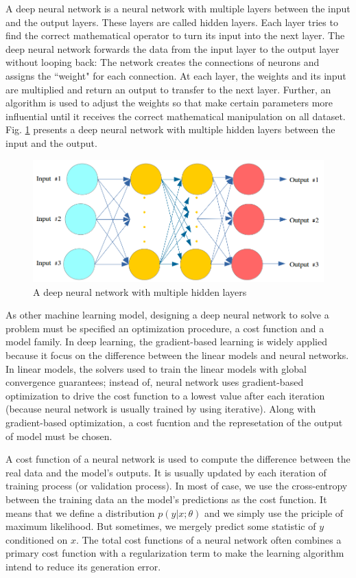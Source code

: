A deep neural network is a neural network with multiple layers between the input and the output layers. These layers are called hidden layers. Each layer tries to find the correct mathematical operator to turn its input into the next layer. The deep neural network forwards the data from the input layer to the output layer without looping back: The network creates the connections of neurons and assigns the ``weight" for each connection. At each layer, the weights and its input are multiplied and return an output to transfer to the next layer. Further, an algorithm is used to adjust the weights so that make certain parameters more influential until it receives the correct mathematical manipulation on all dataset. Fig. \ref{figndeepnetworks} presents a deep neural network with multiple hidden layers between the input and the output.

\begin{figure}[h]
	\centering
	\includegraphics[scale=0.5]{images/deep_neural_network}
	\caption{A deep neural network with multiple hidden layers}
	\label{figndeepnetworks}
\end{figure}

As other machine learning model, designing a deep neural network to solve a problem must be specified an optimization procedure, a cost function and a model family. In deep learning, the gradient-based learning is widely applied because it focus on the difference between the linear models and neural networks. In linear models, the solvers used to train the linear models with global convergence guarantees; instead of, neural network uses gradient-based optimization to drive the cost function to a lowest value after each iteration (because neural network is usually trained by using iterative). Along with gradient-based optimization, a cost fucntion and the represetation of the output of model must be chosen.

A cost function of a neural network is used to compute the difference between the real data and the model's outputs. It is usually updated by each iteration of training process (or validation process). In most of case, we use the cross-entropy between the training data an the model's predictions as the cost function. It means that we define a distribution $p(y | x; \theta)$ and we simply use the priciple of maximum likelihood. But sometimes, we mergely predict some statistic of $y$ conditioned on $x$. The total cost functions of a neural network often combines a primary cost function with a regularization term to make the learning algorithm intend to reduce its generation error.

